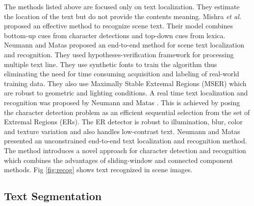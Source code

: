 The methods listed above are focused only on text localization.
They estimate the location of the text but do not provide the contents meaning.
Mishra {\em et al.} \cite{chap2-12} proposed an effective method to recognize scene text. 
Their model combines bottom-up cues from
character detections and top-down cues from lexica.
Neumann and Matas \cite{chap2-10} proposed an end-to-end method for scene text localization and recognition.
They used hypotheses-verification
framework for processing multiple text line. They use 
synthetic fonts to train the algorithm thus eliminating the need for time consuming
acquisition and labeling of real-world training data. They also use
Maximally Stable Extremal Regions (MSER) which
are robust to geometric and lighting conditions.
A real time text localization and recognition was proposed by Neumann and Matas \cite{chap2-15}. 
This is achieved by posing the character detection problem as an efficient sequential selection 
from the set of Extremal Regions (ERs). The ER detector is robust to illumination, blur,
color and texture variation and also handles low-contrast text.
Neumann and Matas \cite{chap2-16} presented an unconstrained end-to-end text localization and recognition method.
The method introduces a novel
approach for character detection and recognition which
combines the advantages of sliding-window and connected
component methods. Fig \ref{fig:recog} shows text recognized in scene images.

\subsection{Text Segmentation}


